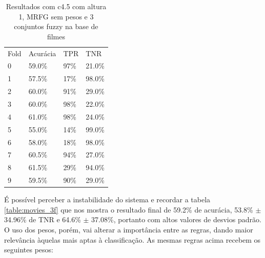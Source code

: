 \documentclass[template.tex]{subfiles}
\begin{document}
\begin{table}[htbp]
	\centering
    \begin{tabular}{llll}
    Fold & Acurácia & TPR & TNR \\
    0 & 59.0\% & 97\% & 21.0\% \\
    1 & 57.5\% & 17\% & 98.0\% \\
    2 & 60.0\% & 91\% & 29.0\% \\
    3 & 60.0\% & 98\% & 22.0\% \\
    4 & 61.0\% & 98\% & 24.0\% \\
    5 & 55.0\% & 14\% & 99.0\% \\
    6 & 58.0\% & 18\% & 98.0\% \\
    7 & 60.5\% & 94\% & 27.0\% \\
    8 & 61.5\% & 29\% & 94.0\% \\
    9 & 59.5\% & 90\% & 29.0\% \\
    \end{tabular}
        \caption{Resultados com c4.5 com altura 1, MRFG sem pesos e 3 conjuntos fuzzy na base de filmes}
    \label{table:movie_folds_2}
\end{table}


É possível perceber a instabilidade do sistema e recordar a tabela \ref{table:movies_3f} que nos mostra o resultado final de 59.2\% de acurácia, 53.8\% $\pm$ 34.96\% de TNR e 64.6\% $\pm$ 37.08\%, portanto com altos valores de desvios padrão. O uso dos pesos, porém, vai alterar a importância entre as regras, dando maior relevância àquelas mais aptas à classificação. As mesmas regras acima recebem os seguintes pesos:
\end{document}
